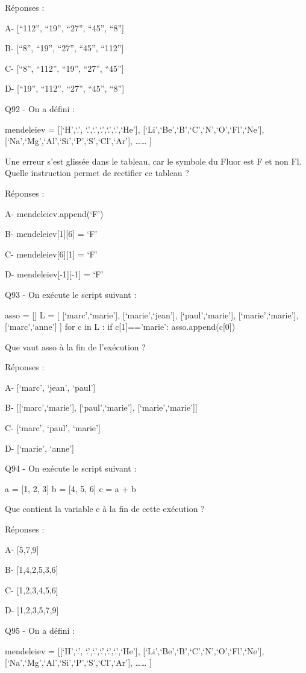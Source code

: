 \documentclass[
]{book}
\begin{document}
Réponses :

A- {[}``112'', ``19'', ``27'', ``45'', ``8''{]}

B- {[}``8'', ``19'', ``27'', ``45'', ``112''{]}

C- {[}``8'', ``112'', ``19'', ``27'', ``45''{]}

D- {[}``19'', ``112'', ``27'', ``45'', ``8''{]}

Q92 - On a défini :

mendeleiev = {[}{[}`H',`.', `.',`.',`.',`.',`.',`He'{]},
{[}`Li',`Be',`B',`C',`N',`O',`Fl',`Ne'{]},
{[}`Na',`Mg',`Al',`Si',`P',`S',`Cl',`Ar'{]},
\ldots\ldots{} {]}

Une erreur s'est glissée dans le tableau, car le symbole du Fluor est F et non Fl. Quelle instruction permet de rectifier ce tableau ?

Réponses :

A- mendeleiev.append(`F')

B- mendeleiev{[}1{]}{[}6{]} = `F'

C- mendeleiev{[}6{]}{[}1{]} = `F'

D- mendeleiev{[}-1{]}{[}-1{]} = `F'

Q93 - On exécute le script suivant :

asso = {[}{]}
L = {[} {[}`marc',`marie'{]}, {[}`marie',`jean'{]}, {[}`paul',`marie'{]}, {[}`marie',`marie'{]}, {[}`marc',`anne'{]} {]}
for c in L :
if c{[}1{]}=='marie':
asso.append(c{[}0{]})

Que vaut asso à la fin de l'exécution ?

Réponses :

A- {[}`marc', `jean', `paul'{]}

B- {[}{[}`marc',`marie'{]}, {[}`paul',`marie'{]}, {[}`marie',`marie'{]}{]}

C- {[}`marc', `paul', `marie'{]}

D- {[}`marie', `anne'{]}

Q94 - On exécute le script suivant :

a = {[}1, 2, 3{]}
b = {[}4, 5, 6{]}
c = a + b

Que contient la variable c à la fin de cette exécution ?

Réponses :

A- {[}5,7,9{]}

B- {[}1,4,2,5,3,6{]}

C- {[}1,2,3,4,5,6{]}

D- {[}1,2,3,5,7,9{]}

Q95 - On a défini :

mendeleiev = {[}{[}`H',`.', `.',`.',`.',`.',`.',`He'{]},
{[}`Li',`Be',`B',`C',`N',`O',`Fl',`Ne'{]},
{[}`Na',`Mg',`Al',`Si',`P',`S',`Cl',`Ar'{]},
\ldots\ldots{} {]}
\end{document}
